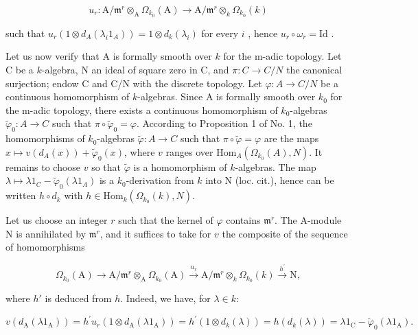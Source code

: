 \[
u _ {r}: \mathrm{A} / \mathfrak {m} ^ {r} \otimes_ {\mathrm{A}} \Omega_ {k _ {0}} (\mathrm{A}) \longrightarrow \mathrm{A} / \mathfrak {m} ^ {r} \otimes_ {k} \Omega_ {k _ {0}} (k)
\]

such that \(u_r(1 \otimes d_A(\lambda_i 1_A)) = 1 \otimes d_k(\lambda_i)\) for every \(i\) , hence \(u_r \circ \omega_r = \mathrm{Id}\) .

Let us now verify that A is formally smooth over \(k\) for the m-adic topology. Let C be a \(k\)-algebra, N an ideal of square zero in C, and \(\pi: C \to C/N\) the canonical surjection; endow C and C/N with the discrete topology. Let \(\varphi: A \to C/N\) be a continuous homomorphism of \(k\)-algebras. Since A is formally smooth over \(k_0\) for the m-adic topology, there exists a continuous homomorphism of \(k_0\)-algebras \(\tilde{\varphi}_0: A \to C\) such that \(\pi \circ \tilde{\varphi}_0 = \varphi\). According to Proposition 1 of No. 1, the homomorphisms of \(k_0\)-algebras \(\tilde{\varphi}: A \to C\) such that \(\pi \circ \tilde{\varphi} = \varphi\) are the maps \(x \mapsto v(d_A(x)) + \tilde{\varphi}_0(x)\), where \(v\) ranges over \(\mathrm{Hom}_{A}(\Omega_{k_0}(A), N)\). It remains to choose \(v\) so that \(\tilde{\varphi}\) is a homomorphism of \(k\)-algebras. The map \(\lambda \mapsto \lambda 1_C - \tilde{\varphi}_0(\lambda 1_A)\) is a \(k_0\)-derivation from \(k\) into N (loc. cit.), hence can be written \(h \circ d_k\) with \(h \in \mathrm{Hom}_k(\Omega_{k_0}(k), N)\).

Let us choose an integer \(r\) such that the kernel of \(\varphi\) contains \(\mathfrak{m}^r\). The A-module N is annihilated by \(\mathfrak{m}^r\), and it suffices to take for \(v\) the composite of the sequence of homomorphisms

\[
\Omega_ {k _ {0}} (\mathrm{A}) \longrightarrow \mathrm{A} / \mathfrak {m} ^ {r} \otimes_ {\mathrm{A}} \Omega_ {k _ {0}} (\mathrm{A}) \xrightarrow {u _ {r}} \mathrm{A} / \mathfrak {m} ^ {r} \otimes_ {k} \Omega_ {k _ {0}} (k) \xrightarrow {h ^ {\prime}} \mathrm{N},
\]

where \(h'\) is deduced from \(h\). Indeed, we have, for \(\lambda \in k\):

\[
v \left(d _ {\mathrm{A}} \left(\lambda 1 _ {\mathrm{A}}\right)\right) = h ^ {\prime} u _ {r} \left(1 \otimes d _ {\mathrm{A}} \left(\lambda 1 _ {\mathrm{A}}\right)\right) = h ^ {\prime} \left(1 \otimes d _ {k} (\lambda)\right) = h \left(d _ {k} (\lambda)\right) = \lambda 1 _ {\mathrm{C}} - \tilde {\varphi} _ {0} \left(\lambda 1 _ {\mathrm{A}}\right).
\]

